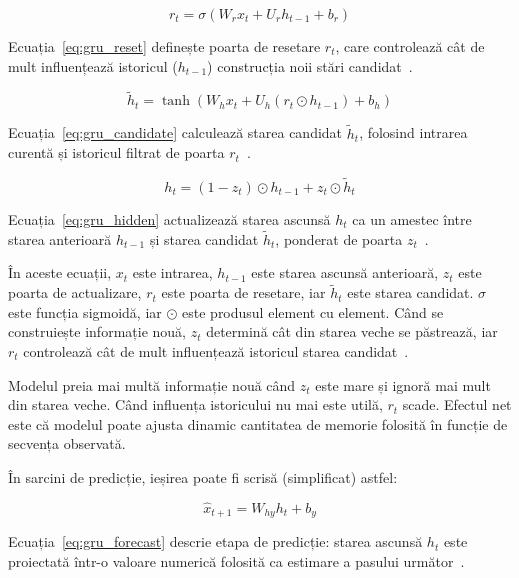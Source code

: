 \begin{equation}
r_t = \sigma(W_r x_t + U_r h_{t-1} + b_r)
\label{eq:gru_reset}
\end{equation}

Ecuația~\ref{eq:gru_reset} definește poarta de resetare $r_t$, care controlează cât de mult influențează istoricul ($h_{t-1}$) construcția noii stări candidat~\cite{cho2014gru, korstanje2025gru}.

\begin{equation}
\tilde{h}_t = \tanh(W_h x_t + U_h (r_t \odot h_{t-1}) + b_h)
\label{eq:gru_candidate}
\end{equation}

Ecuația~\ref{eq:gru_candidate} calculează starea candidat $\tilde{h}_t$, folosind intrarea curentă și istoricul filtrat de poarta $r_t$~\cite{cho2014gru, korstanje2025gru}.

\begin{equation}
h_t = (1 - z_t) \odot h_{t-1} + z_t \odot \tilde{h}_t
\label{eq:gru_hidden}
\end{equation}

Ecuația~\ref{eq:gru_hidden} actualizează starea ascunsă $h_t$ ca un amestec între starea anterioară $h_{t-1}$ și starea candidat $\tilde{h}_t$, ponderat de poarta $z_t$~\cite{cho2014gru, korstanje2025gru}.

În aceste ecuații, $x_t$ este intrarea, $h_{t-1}$ este starea ascunsă anterioară, $z_t$ este poarta de actualizare, $r_t$ este poarta de resetare, iar $\tilde{h}_t$ este starea candidat. $\sigma$ este funcția sigmoidă, iar $\odot$ este produsul element cu element. Când se construiește informație nouă, $z_t$ determină cât din starea veche se păstrează, iar $r_t$ controlează cât de mult influențează istoricul starea candidat~\cite{korstanje2025gru, cho2014gru}.

Modelul preia mai multă informație nouă când $z_t$ este mare și ignoră mai mult din starea veche. Când influența istoricului nu mai este utilă, $r_t$ scade. Efectul net este că modelul poate ajusta dinamic cantitatea de memorie folosită în funcție de secvența observată.

În sarcini de predicție, ieșirea poate fi scrisă (simplificat) astfel:

\begin{equation}
\hat{x}_{t+1} = W_{hy} h_t + b_y
\label{eq:gru_forecast}
\end{equation}

Ecuația~\ref{eq:gru_forecast} descrie etapa de predicție: starea ascunsă $h_t$ este proiectată într-o valoare numerică folosită ca estimare a pasului următor~\cite{cho2014gru, korstanje2025gru}.

